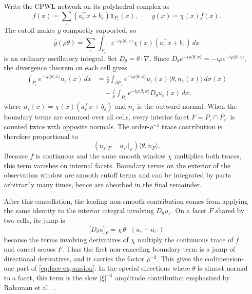 \documentclass{article}
\newcommand{\wh}{\widehat}
\begin{document}
\iffalse
Write the CPWL network on its polyhedral complex as
\begin{equation}
f(x)=\sum_{\varepsilon}
(a_\varepsilon^\top x+b_\varepsilon)\mathbf 1_{P_\varepsilon}(x),
\qquad
g(x)=\chi(x)f(x).
\end{equation}
The cutoff makes $g$ compactly supported, so
\begin{equation}
\wh g(\rho\theta)
=
\sum_\varepsilon
\int_{P_\varepsilon}
e^{-i\rho\langle \theta,x\rangle}
\chi(x)(a_\varepsilon^\top x+b_\varepsilon)\,dx
\end{equation}
is an ordinary oscillatory integral. Set $D_\theta=\theta\cdot\nabla$. Since
$D_\theta e^{-i\rho\langle\theta,x\rangle}=-i\rho e^{-i\rho\langle\theta,x\rangle}$,
the divergence theorem on each cell gives
\begin{align}
\int_{P_\varepsilon}e^{-i\rho\langle\theta,x\rangle}u_\varepsilon(x)\,dx
&=
\frac{i}{\rho}
\int_{\partial P_\varepsilon}
e^{-i\rho\langle\theta,x\rangle}
u_\varepsilon(x)\langle\theta,n_\varepsilon(x)\rangle\,d\sigma(x)
\nonumber\\
&\quad
-
\frac{i}{\rho}
\int_{P_\varepsilon}
e^{-i\rho\langle\theta,x\rangle}
D_\theta u_\varepsilon(x)\,dx,
\label{eq:first-ibp-cell}
\end{align}
where $u_\varepsilon(x)=\chi(x)(a_\varepsilon^\top x+b_\varepsilon)$ and
$n_\varepsilon$ is the outward normal. When the boundary terms are summed over all cells, every interior facet $F=P_\varepsilon\cap P_{\varepsilon'}$ is counted twice with opposite normals. The order-$\rho^{-1}$ trace contribution is therefore proportional to
\begin{equation}
\left(u_\varepsilon|_F-u_{\varepsilon'}|_F\right)
\langle \theta,n_F\rangle .
\end{equation}
Because $f$ is continuous and the same smooth window $\chi$ multiplies both traces, this term vanishes on internal facets. Boundary terms on the exterior of the observation window are smooth cutoff terms and can be integrated by parts arbitrarily many times, hence are absorbed in the final remainder.

After this cancellation, the leading non-smooth contribution comes from applying the same identity to the interior integral involving $D_\theta u_\varepsilon$. On a facet $F$ shared by two cells, its jump is
\begin{equation}
\big[D_\theta u\big]_F
=
\chi\,\theta^\top(a_\varepsilon-a_{\varepsilon'})
\end{equation}
because the terms involving derivatives of $\chi$ multiply the continuous trace of $f$ and cancel across $F$. Thus the first non-canceling boundary term is a jump of directional derivatives, and it carries the factor $\rho^{-2}$. This gives the codimension-one part of \eqref{eq:face-expansion}. In the special directions where $\theta$ is almost normal to a facet, this term is the slow $|\xi|^{-2}$ amplitude contribution emphasized by Rahaman et al.~\citep{rahaman2019}.
\end{document}
